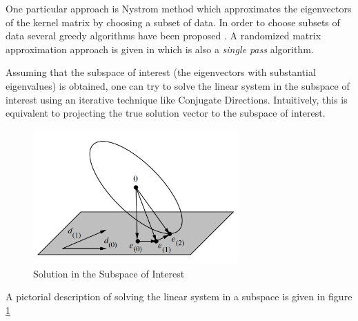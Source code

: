 \documentclass{article}
\begin{document}
One particular approach is Nystrom method which approximates the eigenvectors of the kernel matrix by choosing a subset of data. In order to choose subsets of data several greedy algorithms have been proposed \cite{rasmussen} \cite{smolaGreedy}. A randomized matrix approximation approach is given in \cite{RandomizedMatrixDecompose} which is also a \textit{single pass} algorithm. 

Assuming that the subspace of interest (the eigenvectors with substantial eigenvalues) is obtained, one can try to solve the linear system in the subspace of interest using an iterative technique like Conjugate Directions. Intuitively, this is equivalent to projecting the true solution vector to the subspace of interest.
\begin{figure}[b!] \label{fig:subspace}
  \caption{Solution in the Subspace of Interest}
  \centering
    \includegraphics[width=0.7\textwidth]{subspace}
\end{figure}
A pictorial description of solving the linear system in a subspace is given in figure \ref{fig:subspace}
\end{document}
